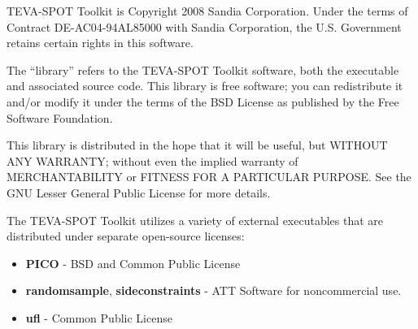 TEVA-SPOT Toolkit is Copyright 2008 Sandia Corporation. Under the
terms of Contract DE-AC04-94AL85000 with Sandia Corporation, the
U.S. Government retains certain rights in this software.

The ``library'' refers to the TEVA-SPOT Toolkit software, both the
executable and associated source code.  This library is free software;
you can redistribute it and/or modify it under the terms of the BSD 
License as published by the Free Software Foundation.

This library is distributed in the hope that it will be useful, but
WITHOUT ANY WARRANTY; without even the implied warranty of MERCHANTABILITY
or FITNESS FOR A PARTICULAR PURPOSE. See the GNU Lesser General Public
License for more details.

The TEVA-SPOT Toolkit utilizes a variety of external executables that
are distributed under separate open-source licenses:
\begin{itemize}

  \item {\bf PICO} - BSD and Common Public License

  \item {\bf randomsample}, {\bf sideconstraints} - ATT Software for noncommercial use.

  \item {\bf ufl} - Common Public License

\end{itemize}
  
